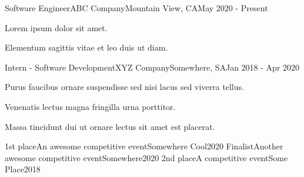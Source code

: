 \documentclass[11pt, a4paper]{awesome-cv}
\begin{document}
        \begin{cventries}

        
                  \cventry
                {Software Engineer}{ABC Company}{Mountain View, CA}{May 2020 - Present}
                        {
                          \begin{cvitems}
                            \item{Lorem ipsum dolor sit amet.}    \item{Elementum sagittis vitae et leo duis ut diam.}
                          \end{cvitems}
                        }
                  \cventry
                {Intern - Software Development}{XYZ Company}{Somewhere, SA}{Jan 2018 - Apr 2020}
                        {
                          \begin{cvitems}
                            \item{Purus faucibus ornare suspendisse sed nisi lacus sed viverra tellus.}    \item{Venenatis lectus magna fringilla urna porttitor.}    \item{Massa tincidunt dui ut ornare lectus sit amet est placerat.}
                          \end{cvitems}
                        }
        \end{cventries}

        

        \begin{cvhonors}

        
                  \cvhonor
                {1st place}{An awesome competitive event}{Somewhere Cool}{2020}
                  \cvhonor
                {Finalist}{Another awesome competitive event}{Somewhere}{2020}
                  \cvhonor
                {2nd place}{A competitive event}{Some Place}{2018}
        \end{cvhonors}

        
\end{document}
